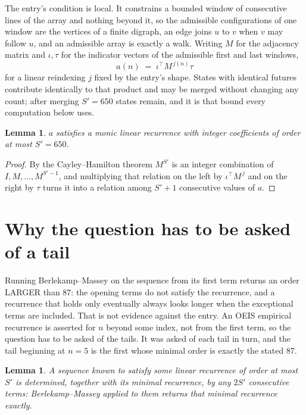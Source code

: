 \documentclass[11pt,a4paper]{article}
\theoremstyle{plain}
\newtheorem{lemma}[theorem]{Lemma}
\theoremstyle{definition}
\begin{document}
The entry's condition is local. It constrains a bounded window of consecutive lines of the
array and nothing beyond it, so the admissible configurations of one window are the vertices of
a finite digraph, an edge joins $u$ to $v$ when $v$ may follow $u$, and an admissible array is
exactly a walk. Writing $M$ for the adjacency matrix and $\iota,\tau$ for the indicator vectors
of the admissible first and last windows,
\[
a(n)\;=\;\iota^{\!\top}M^{\,j(n)}\tau
\]
for a linear reindexing $j$ fixed by the entry's shape. States with identical futures
contribute identically to that product and may be merged without changing any count; after
merging $S'=650$ states remain, and it is that bound every computation below uses.

\begin{lemma}\label{lem:cf}
$a$ satisfies a monic linear recurrence with integer coefficients of order at most $S'=650$.
\end{lemma}

\begin{proof}
By the Cayley--Hamilton theorem $M^{S'}$ is an integer combination of $I,M,\dots,M^{S'-1}$,
and multiplying that relation on the left by $\iota^{\!\top}M^{\,j}$ and on the right by
$\tau$ turns it into a relation among $S'+1$ consecutive values of $a$.
\end{proof}

\section{Why the question has to be asked of a tail}

Running Berlekamp--Massey on the sequence from its first term returns an order LARGER than $87$: the opening terms do not satisfy the recurrence, and a recurrence that holds only eventually always looks longer when the exceptional terms are included. That is not evidence against the entry. An OEIS empirical recurrence is asserted for $n$ beyond some index, not from the first term, so the question has to be asked of the tails. It was asked of each tail in turn, and the tail beginning at $n=5$ is the first whose minimal order is exactly the stated $87$.

\begin{lemma}\label{lem:bm}
A sequence known to satisfy some linear recurrence of order at most $S'$ is determined,
together with its minimal recurrence, by any $2S'$ consecutive terms: Berlekamp--Massey applied
to them returns that minimal recurrence exactly.
\end{lemma}
\end{document}
